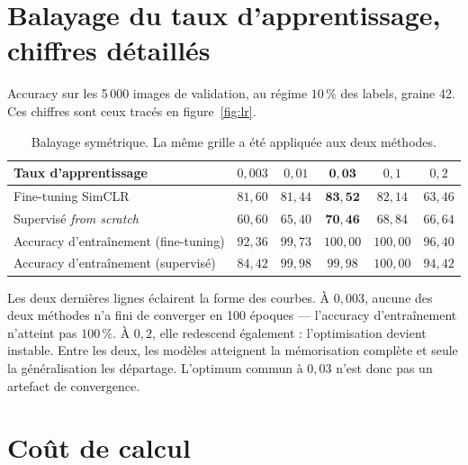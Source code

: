 \documentclass[11pt,a4paper]{article}
\begin{document}
\section{Balayage du taux d'apprentissage, chiffres détaillés}
\label{ann:lr}

Accuracy sur les 5\,000 images de validation, au régime $10\,\%$ des labels, graine 42.
Ces chiffres sont ceux tracés en figure~\ref{fig:lr}.

\begin{table}[htbp]
\centering\small
\caption{Balayage symétrique. La même grille a été appliquée aux deux méthodes.}
\begin{tabular}{@{}lccccc@{}}
\toprule
\textbf{Taux d'apprentissage} & $0{,}003$ & $0{,}01$ & $\mathbf{0{,}03}$ & $0{,}1$ & $0{,}2$ \\
\midrule
Fine-tuning SimCLR      & $81{,}60$ & $81{,}44$ & $\mathbf{83{,}52}$ & $82{,}14$ & $63{,}46$ \\
Supervisé \emph{from scratch} & $60{,}60$ & $65{,}40$ & $\mathbf{70{,}46}$ & $68{,}84$ & $66{,}64$ \\
\midrule
Accuracy d'entraînement (fine-tuning) & $92{,}36$ & $99{,}73$ & $100{,}00$ & $100{,}00$ & $96{,}40$ \\
Accuracy d'entraînement (supervisé) & $84{,}42$ & $99{,}98$ & $99{,}98$ & $100{,}00$ & $94{,}42$ \\
\bottomrule
\end{tabular}
\end{table}

Les deux dernières lignes éclairent la forme des courbes. À $0{,}003$, aucune des deux
méthodes n'a fini de converger en 100 époques --- l'accuracy d'entraînement n'atteint pas
$100\,\%$. À $0{,}2$, elle redescend également : l'optimisation devient instable. Entre les
deux, les modèles atteignent la mémorisation complète et seule la généralisation les
départage. L'optimum commun à $0{,}03$ n'est donc pas un artefact de convergence.

\section{Coût de calcul}
\label{ann:cout}
\end{document}
